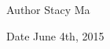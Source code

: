\begin{DoxyAuthor}{Author}
Stacy Ma 
\end{DoxyAuthor}
\begin{DoxyDate}{Date}
June 4th, 2015 
\end{DoxyDate}

